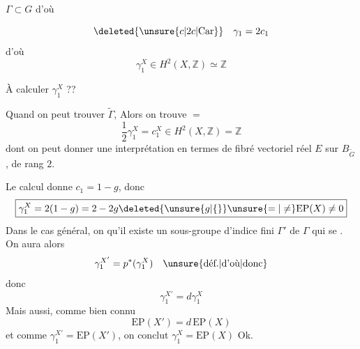 $\Gamma\subset G$ d'où

\[
\deleted{\unsure{c|2c|\text{Car}}}\quad\gamma_1=2c_1
\]
d'où
\[
\boxed{\gamma_1^X\in H^2(X,\mathbb Z)\simeq\boxed{\mathbb Z}}
\]

À calculer $\gamma_1^X$ ??

 Quand on peut trouver $\widetilde\Gamma$,
Alors on trouve $=$
\[
\boxed{\frac12\gamma_1^X=c_1^X\in H^2(X,\mathbb Z)=\mathbb Z}
\]
dont on peut donner une interprétation en termes  de fibré vectoriel réel $E$ sur $B_{\widetilde G}$, de rang $2$.

Le calcul donne $c_1=1-g$, donc
\[
\boxed{\gamma_1^X=2(1-g)=2-2g\deleted{\unsure{g|\{}}\unsure{=|\ne}\mathrm{EP}(X)\ne0}
\]
Dans le cas général, on  qu'il existe un sous-groupe d'indice fini $\Gamma'$ de $\Gamma$ qui se .
On aura alors
\[
\gamma_1^{X'}=p^*(\gamma_1^X)\quad\text{\unsure{déf.|d'où|donc}}
\]
donc 
\[
\gamma_1^{X'}=d\gamma_1^X
\]
Mais aussi, comme bien connu
\[
\mathrm{EP}(X')=d\,\mathrm{EP}(X)
\]
et comme $\gamma_1^{X'}=\mathrm{EP}(X')$, on conclut $\gamma_1^X=\mathrm{EP}(X)$ Ok.

